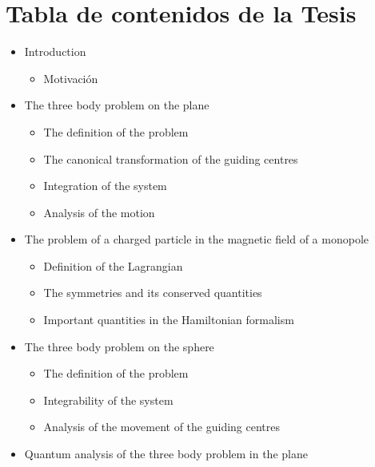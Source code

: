 \documentclass[xcolor=dvipsnames]{beamer}
\begin{document}
\section{Tabla de contenidos de la Tesis}
\begin{frame}[allowframebreaks]
\begin{itemize}
\item Introduction\\
\begin{itemize}
\item Motivación\\
\end{itemize}
\item The three body problem on the plane\\
\begin{itemize}
\item The definition of the problem\\
\item The canonical transformation of the guiding centres\\
\item Integration of the system\\
\item Analysis of the motion\\
\end{itemize}
\item The problem of a charged particle in the magnetic field of a monopole\
\begin{itemize}
\item Definition of the Lagrangian\\
\item The symmetries and its conserved quantities\\
\item Important quantities in the Hamiltonian formalism\\
\end{itemize}
\item The three body problem on the sphere\\
\begin{itemize}
\item The definition of the problem\\
\item Integrability of the system\\
\item Analysis of the movement of the guiding centres\\
\end{itemize}
\item Quantum analysis of the three body problem in the plane\\

\end{itemize}
\end{frame}
\end{document}
